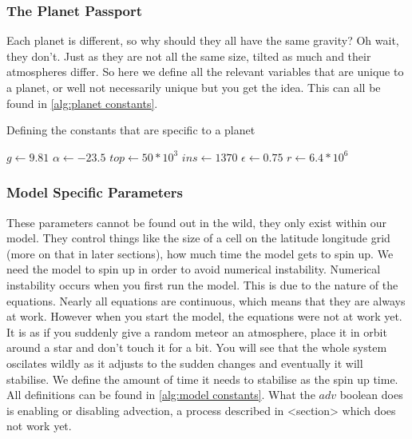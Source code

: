\subsubsection{The Planet Passport}
Each planet is different, so why should they all have the same gravity? Oh wait, they don't. Just as they are not all the same size, tilted as much and their atmospheres differ. So here we define
all the relevant variables that are unique to a planet, or well not necessarily unique but you get the idea. This can all be found in \autoref{alg:planet constants}.

\begin{algorithm}
    \caption{Defining the constants that are specific to a planet}
    \label{alg:planet constants}
    $g \leftarrow 9.81$ 
    $\alpha \leftarrow -23.5$ 
    $top \leftarrow 50*10^3$ 
    $ins \leftarrow 1370$ 
    $\epsilon \leftarrow 0.75$ 
    $r \leftarrow 6.4*10^6$ 
\end{algorithm}

\subsubsection{Model Specific Parameters}
These parameters cannot be found out in the wild, they only exist within our model. They control things like the size of a cell on the latitude longitude grid (more on that in later sections),
how much time the model gets to spin up. We need the model to spin up in order to avoid numerical instability. Numerical instability occurs when you first run the model. This is due to the nature of the equations. Nearly all equations are continuous, which means that they are always at work. However 
when you start the model, the equations were not at work yet. It is as if you suddenly give a random meteor an atmosphere, place it in orbit around a star and don't touch it for a bit. You will 
see that the whole system oscilates wildly as it adjusts to the sudden changes and eventually it will stabilise. We define the amount of time it needs to stabilise as the spin up time. All 
definitions can be found in \autoref{alg:model constants}. What the $adv$ boolean does is enabling or disabling advection, a process described in <section> which does not work yet.

